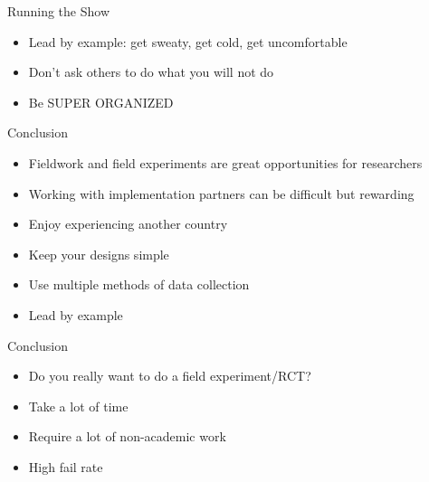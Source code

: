 \documentclass[11pt,ignorenonframetext,xcolor={svgnames}]{beamer}
\providecommand{\tightlist}{%
  \setlength{\itemsep}{0pt}\setlength{\parskip}{0pt}}
\begin{document}
\begin{frame}{Running the Show}
\protect\hypertarget{running-the-show-1}{}
\begin{itemize}
\tightlist
\item
  Lead by example: get sweaty, get cold, get uncomfortable
\item
  Don't ask others to do what you will not do
\item
  Be SUPER ORGANIZED
\end{itemize}
\end{frame}

\begin{frame}{Conclusion}
\protect\hypertarget{conclusion}{}
\begin{itemize}
\tightlist
\item
  Fieldwork and field experiments are great opportunities for
  researchers
\item
  Working with implementation partners can be difficult but rewarding
\item
  Enjoy experiencing another country
\item
  Keep your designs simple
\item
  Use multiple methods of data collection
\item
  Lead by example
\end{itemize}
\end{frame}

\begin{frame}{Conclusion}
\protect\hypertarget{conclusion-1}{}
\begin{itemize}
\tightlist
\item
  Do you really want to do a field experiment/RCT?
\end{itemize}

\medskip

\begin{itemize}
\tightlist
\item
  Take a lot of time
\item
  Require a lot of non-academic work
\item
  High fail rate
\end{itemize}
\end{frame}
\end{document}
